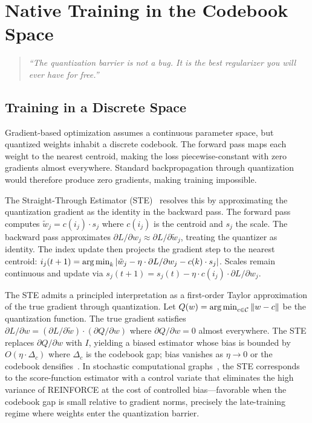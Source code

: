 
\chapter{Native Training in the Codebook Space}
\label{ch:native_training}

\begin{quote}
\textit{``The quantization barrier is not a bug. It is the best regularizer you will ever have for free.''}
\end{quote}

\section{Training in a Discrete Space}
\label{sec:discrete_space}

Gradient-based optimization assumes a continuous parameter space, but
quantized weights inhabit a discrete codebook.  The forward pass maps
each weight to the nearest centroid, making the loss piecewise-constant
with zero gradients almost everywhere.  Standard backpropagation through
quantization would therefore produce zero gradients, making training
impossible.

The Straight-Through Estimator (STE)~\cite{bengio2013} resolves this by
approximating the quantization gradient as the identity in the backward
pass.  The forward pass computes $\tilde{w}_j = c(i_j) \cdot s_j$ where
$c(i_j)$ is the centroid and $s_j$ the scale.  The backward pass
approximates $\partial L / \partial w_j \approx \partial L / \partial
\tilde{w}_j$, treating the quantizer as identity.  The index update then
projects the gradient step to the nearest centroid:
$i_j(t+1) = \argmin_k |\tilde{w}_j - \eta \cdot \partial L / \partial w_j
- c(k) \cdot s_j|$.  Scales remain continuous and update via $s_j(t+1) =
s_j(t) - \eta \cdot c(i_j) \cdot \partial L / \partial w_j$.

The STE admits a principled interpretation as a first-order Taylor
approximation of the true gradient through quantization.  Let $Q(w) =
\argmin_{c \in \mathcal{C}} \|w - c\|$ be the quantization function.  The
true gradient satisfies $\partial L / \partial w = (\partial L / \partial
\tilde{w}) \cdot (\partial Q / \partial w)$ where $\partial Q / \partial
w = 0$ almost everywhere.  The STE replaces $\partial Q / \partial w$
with $I$, yielding a biased estimator whose bias is bounded by $O(\eta
\cdot \Delta_c)$ where $\Delta_c$ is the codebook gap; bias vanishes as
$\eta \to 0$ or the codebook densifies~\cite{yin2019}.  In stochastic
computational graphs~\cite{schulman2015}, the STE corresponds to the
score-function estimator with a control variate that eliminates the high
variance of REINFORCE at the cost of controlled bias---favorable when the
codebook gap is small relative to gradient norms, precisely the late-training
regime where weights enter the quantization barrier.

